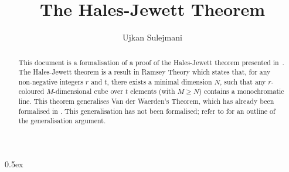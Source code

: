\documentclass[11pt,a4paper]{article}
\begin{document}
\title{The Hales-Jewett Theorem}
\author{Ujkan Sulejmani}
\maketitle

\begin{abstract}
    This document is a formalisation of a proof of the Hales-Jewett theorem presented in~\cite{thebook}.
    The Hales-Jewett theorem is a result in Ramsey Theory which states that, for any non-negative integers $r$ and $t$, there exists a minimal dimension $N$, such that any $r$-coloured $M$-dimensional cube over $t$ elements (with $M \geq N$) contains a monochromatic line. This theorem generalises Van der Waerden's Theorem, which has already been formalised in \cite{vdw}. This generalisation has not been formalised; refer to \cite{thebook} for an outline of the generalisation argument.
\end{abstract}


\newpage
\tableofcontents

\newpage
\parindent 0pt\parskip 0.5ex



\nocite{vdw}


\end{document}
